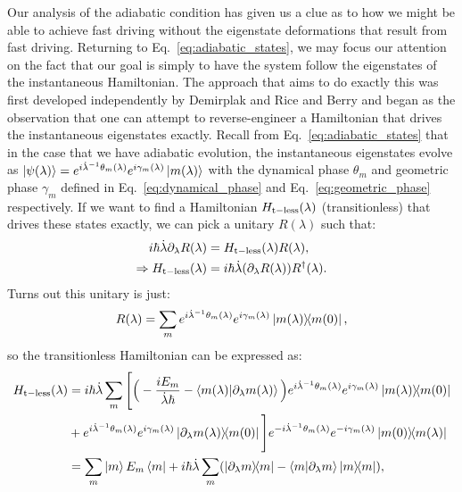     Our analysis of the adiabatic condition has given us a clue as to how we might be able to achieve fast driving without the eigenstate deformations that result from fast driving. Returning to Eq.~\eqref{eq:adiabatic_states}, we may focus our attention on the fact that our goal is simply to have the system follow the eigenstates of the instantaneous Hamiltonian. The approach that aims to do exactly this was first developed independently by Demirplak and Rice \cite{demirplak_adiabatic_2003} and Berry \cite{berry_transitionless_2009} and began as the observation that one can attempt to reverse-engineer a Hamiltonian that drives the instantaneous eigenstates exactly. Recall from Eq.~\eqref{eq:adiabatic_states} that in the case that we have adiabatic evolution, the instantaneous eigenstates evolve as $\ket{\psi(\lambda)} = e^{i \dot{\lambda}^{-1} \theta_m(\lambda)}e^{i \gamma_m(\lambda)} \ket{m(\lambda)}$ with the dynamical phase $\theta_m$ and geometric phase $\gamma_m$ defined in Eq.~\eqref{eq:dynamical_phase} and Eq.~\eqref{eq:geometric_phase} respectively. If we want to find a Hamiltonian $H_{\rm t-less} (\lambda)$ (transitionless) that drives these states exactly, we can pick a unitary $R(\lambda)$ such that:
    \begin{equation}
        \begin{aligned}
            i\hbar \dot{\lambda} \partial_{\lambda} R(\lambda) &= H_{\rm t-less} (\lambda) R(\lambda), \\
            \Rightarrow H_{\rm t-less} (\lambda) &= i\hbar \dot{\lambda} (\partial_{\lambda} R(\lambda)) R^{\dagger}(\lambda).
        \end{aligned}
    \end{equation}
    Turns out this unitary is just:
    \begin{equation}\label{eq:transitionless_unitary}
        R(\lambda) = \sum_m e^{i \dotlambda^{-1} \theta_m(\lambda)}e^{i \gamma_m(\lambda)} \dyad{m(\lambda)}{m(0)},
    \end{equation}
    so the transitionless Hamiltonian can be expressed as:
    \begin{equation}
        \begin{aligned}\label{eq:transitionless_hamiltonian}
            \begin{aligned}
                H_{\rm t-less}(\lambda) &= i \hbar \dotlambda \sum_m \Bigg[ \Big(- \frac{i E_m}{\dotlambda \hbar} - \braket{m(\lambda)}{\dlambda m(\lambda)}\Big) e^{i \dotlambda^{-1} \theta_m(\lambda)}e^{i \gamma_m(\lambda)} \dyad{m(\lambda)}{m(0)} \\
                &+ e^{i \dotlambda^{-1} \theta_m(\lambda)}e^{i \gamma_m(\lambda)} \dyad{\dlambda m(\lambda)}{m(0)} \Bigg] e^{-i \dotlambda^{-1} \theta_m(\lambda)}e^{-i \gamma_m(\lambda)} \dyad{m(0)}{m(\lambda)} \\
                 &= \sum_m \ket{m} E_m \bra{m} + i\hbar \dotlambda \sum_m (\dyad{\dlambda m}{m} - \braket{m}{\dlambda m} \dyad{m}),
            \end{aligned}
        \end{aligned}
    \end{equation}
